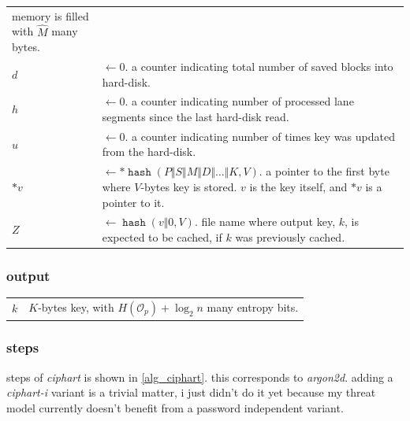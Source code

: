 \documentclass[twocolumn]{article}
\DeclareMathOperator{\hash}{\mathtt{hash}}
\begin{document}
\begin{tabularx}{\columnwidth}{lX}
                    memory is filled with $\hat M$ many bytes.\\
    $d$         & $\gets 0$.  a counter indicating total number of saved
                    blocks into hard-disk.\\
    $h$         & $\gets 0$.  a counter indicating number of processed lane
                    segments since the last hard-disk read.\\
    $u$         & $\gets 0$.  a counter indicating number of times key was
                    updated from the hard-disk.\\
    $*v$         & $\gets *\hash(P \Vert S \Vert M \Vert D \Vert \ldots
                    \Vert K, V)$.  a pointer to the first byte where
                    $V$-bytes key is stored.  $v$ is the key itself, and
                    $*v$ is a pointer to it.\\
    $Z$         & $\gets \hash(v \Vert 0, V)$.  file name where output key,
                    $k$, is expected to be cached, if $k$ was previously
                    cached.\\
\end{tabularx}

\subsubsection{output}
\begin{tabularx}{\columnwidth}{lX}
$k$ & $K$-bytes key, with $H(\mathcal{O}_p) + \log_2 n$ many entropy
        bits.\\
\end{tabularx}

\subsubsection{steps}
steps of \emph{ciphart} is shown in \cref{alg_ciphart}.  this corresponds
to \emph{argon2d}.  adding a \emph{ciphart-i} variant is a trivial matter,
i just didn't do it yet because my threat model currently doesn't benefit
from a password independent variant.
\end{document}

